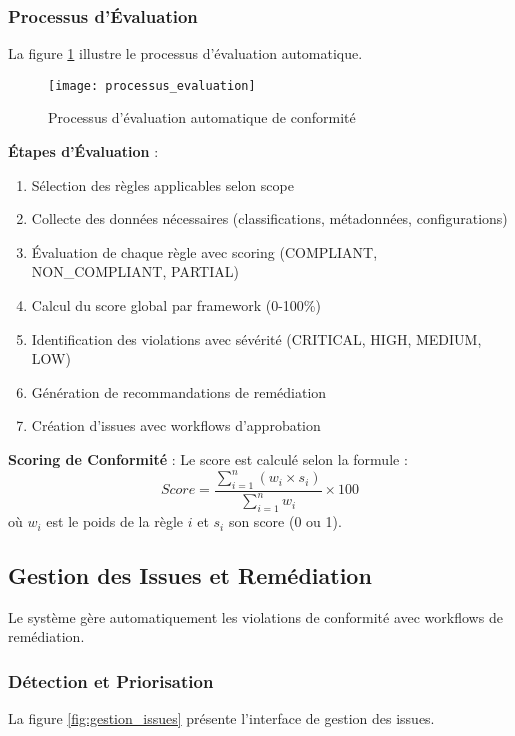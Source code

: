 \subsubsection{Processus d'Évaluation}

La figure \ref{fig:processus_evaluation} illustre le processus d'évaluation automatique.

\begin{figure}[htpb]
\centering
\texttt{[image: processus\_evaluation]}
\caption{Processus d'évaluation automatique de conformité}
\label{fig:processus_evaluation}
\end{figure}

\textbf{Étapes d'Évaluation} :
\begin{enumerate}
    \item Sélection des règles applicables selon scope
    \item Collecte des données nécessaires (classifications, métadonnées, configurations)
    \item Évaluation de chaque règle avec scoring (COMPLIANT, NON\_COMPLIANT, PARTIAL)
    \item Calcul du score global par framework (0-100\%)
    \item Identification des violations avec sévérité (CRITICAL, HIGH, MEDIUM, LOW)
    \item Génération de recommandations de remédiation
    \item Création d'issues avec workflows d'approbation
\end{enumerate}

\textbf{Scoring de Conformité} : Le score est calculé selon la formule :
\[
Score = \frac{\sum_{i=1}^{n} (w_i \times s_i)}{\sum_{i=1}^{n} w_i} \times 100
\]
où $w_i$ est le poids de la règle $i$ et $s_i$ son score (0 ou 1).

\subsection{Gestion des Issues et Remédiation}

Le système gère automatiquement les violations de conformité avec workflows de remédiation.

\subsubsection{Détection et Priorisation}

La figure \ref{fig:gestion_issues} présente l'interface de gestion des issues.

